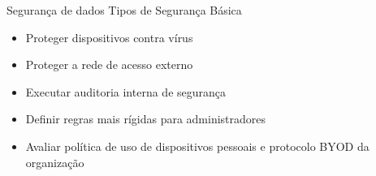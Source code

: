 \documentclass[t]{beamer}
\begin{document}
\begin{frame}{Segurança de dados}
Tipos de Segurança Básica
\begin{itemize}
\item Proteger dispositivos contra vírus
\item Proteger a rede de acesso externo
\item Executar auditoria interna de segurança
\item Definir regras mais rígidas para administradores
\item Avaliar política de uso de dispositivos pessoais e protocolo BYOD da organização
\end{itemize}
\end{frame}

\frame{\titlepage}
\end{document}
